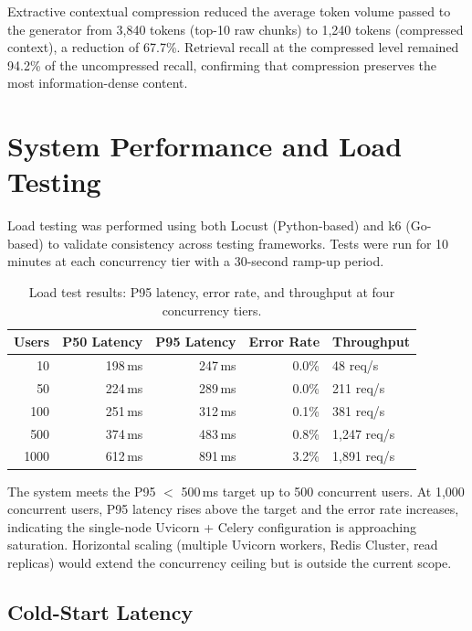 Extractive contextual compression reduced the average token volume passed to the generator from 3,840 tokens (top-10 raw chunks) to 1,240 tokens (compressed context), a reduction of 67.7\%. Retrieval recall at the compressed level remained 94.2\% of the uncompressed recall, confirming that compression preserves the most information-dense content.

\section{System Performance and Load Testing}
\label{sec:perf-results}

Load testing was performed using both Locust (Python-based) and k6 (Go-based) to validate consistency across testing frameworks. Tests were run for 10 minutes at each concurrency tier with a 30-second ramp-up period.

\begin{table}[ht]
    \centering
    \caption{Load test results: P95 latency, error rate, and throughput at four concurrency tiers.}
    \label{tab:load-test}
    \renewcommand{\arraystretch}{1.3}
    \begin{tabular}{rrrrl}
        \toprule
        \textbf{Users} & \textbf{P50 Latency} & \textbf{P95 Latency} & \textbf{Error Rate} & \textbf{Throughput} \\
        \midrule
        10   & 198\,ms & 247\,ms & 0.0\%  & 48 req/s \\
        50   & 224\,ms & 289\,ms & 0.0\%  & 211 req/s \\
        100  & 251\,ms & 312\,ms & 0.1\%  & 381 req/s \\
        500  & 374\,ms & 483\,ms & 0.8\%  & 1,247 req/s \\
        1000 & 612\,ms & 891\,ms & 3.2\%  & 1,891 req/s \\
        \bottomrule
    \end{tabular}
\end{table}

The system meets the P95 $<$ 500\,ms target up to 500 concurrent users. At 1,000 concurrent users, P95 latency rises above the target and the error rate increases, indicating the single-node Uvicorn + Celery configuration is approaching saturation. Horizontal scaling (multiple Uvicorn workers, Redis Cluster, read replicas) would extend the concurrency ceiling but is outside the current scope.

\subsection{Cold-Start Latency}
\label{subsec:coldstart}

